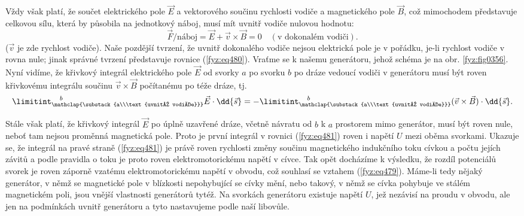   Vždy však platí, že součet elektrického pole \(\vec{E}\) a vektorového součinu rychlosti vodiče a 
  magnetického pole \(\vec{B}\), což mimochodem představuje celkovou sílu, která by působila na 
  jednotkový náboj, musí mít uvnitř vodiče nulovou hodnotu:
  \begin{equation}\label{fyz:eq480}
   \vec{F}/\text{náboj} = \vec{E} + \vec{v}\times\vec{B} = 0\quad(\text{v dokonalém vodiči}).
  \end{equation}
  (\(\vec{v}\) je zde rychlost vodiče). Naše pozdější tvrzení, že uvnitř dokonalého vodiče nejsou 
  elektrická pole je v pořádku, je-li rychlost vodiče v rovna nule; jinak správné tvrzení 
  představuje rovnice (\ref{fyz:eq480}). Vraťme se k našemu generátoru, jehož schéma je na obr. 
  \ref{fyz:fig0356}. Nyní vidíme, že křivkový integrál elektrického pole \(\vec{E}\) od svorky \(a\) 
  po svorku \(b\) po dráze vedoucí vodiči v generátoru musí být roven křivkovému integrálu součinu 
  \(\vec{v}\times\vec{B}\) počítanému po téže dráze, tj.
  \begin{equation}\label{fyz:eq481}
       \limitint_{\mathclap{\substack{a\\\text{uvnitř vodiče}}}}^{\quad b}\vec{E}\cdot\dd{\vec{s}} =
     - \limitint_{\mathclap{\substack{a\\\text{uvnitř vodiče}}}}^{\quad b} 
                                   (\vec{v}\times\vec{B})\cdot\dd{\vec{s}}.
  \end{equation}

  Stále však platí, že křivkový integrál \(\vec{E}\) po úplně uzavřené dráze, včetně návratu od 
  \(b\) k \(a\) prostorem mimo generátor, musí být roven nule, neboť tam nejsou proměnná magnetická 
  pole. Proto je první integrál v rovnici (\ref{fyz:eq481}) roven i napětí \(U\) mezi oběma 
  svorkami. Ukazuje se, že integrál na pravé straně (\ref{fyz:eq481}) je právě roven rychlosti 
  změny součinu magnetického indukčního toku cívkou a počtu jejích závitů a podle pravidla o toku 
  je proto roven elektromotorickému napětí v cívce. Tak opět docházíme k výsledku, že rozdíl 
  potenciálů svorek je roven záporně vzatému elektromotorickému napětí v obvodu, což souhlasí se 
  vztahem (\ref{fyz:eq479}). Máme-li tedy nějaký generátor, v němž se magnetické pole v blízkosti 
  nepohybující se cívky mění, nebo takový, v němž se cívka pohybuje ve stálém magnetickém poli, 
  jsou vnější vlastnosti generátorů tytéž. Na svorkách generátoru existuje napětí \(U\), jež 
  nezávisí na proudu v obvodu, ale jen na podmínkách uvnitř generátoru a tyto nastavujeme podle 
  naší libovůle. 
  
